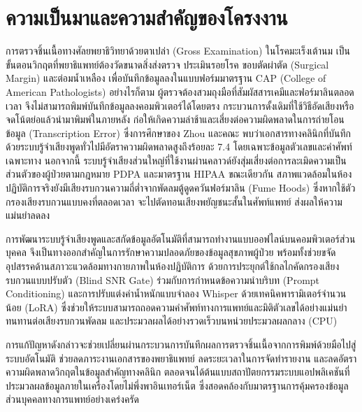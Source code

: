 \section{ความเป็นมาและความสำคัญของโครงงาน}
การตรวจชิ้นเนื้อทางศัลยพยาธิวิทยาด้วยตาเปล่า (Gross Examination) ในโรคมะเร็งเต้านม เป็นขั้นตอนวิกฤตที่พยาธิแพทย์ต้องวัดขนาดสิ่งส่งตรวจ ประเมินรอยโรค ขอบตัดผ่าตัด (Surgical Margin) และต่อมน้ำเหลือง เพื่อบันทึกข้อมูลลงในแบบฟอร์มมาตรฐาน CAP (College of American Pathologists) \cite{cap_breast, ajcc2017} อย่างไรก็ตาม ผู้ตรวจต้องสวมถุงมือที่สัมผัสสารเคมีและฟอร์มาลินตลอดเวลา จึงไม่สามารถพิมพ์บันทึกข้อมูลลงคอมพิวเตอร์ได้โดยตรง กระบวนการดั้งเดิมที่ใช้วิธีอัดเสียงหรือจดโน้ตย่อแล้วนำมาพิมพ์ในภายหลัง ก่อให้เกิดความล่าช้าและเสี่ยงต่อความผิดพลาดในการถ่ายโอนข้อมูล (Transcription Error) \cite{zhou2018errors} ซึ่งการศึกษาของ Zhou และคณะ พบว่าเอกสารทางคลินิกที่บันทึกด้วยระบบรู้จำเสียงพูดทั่วไปมีอัตราความผิดพลาดสูงถึงร้อยละ 7.4 โดยเฉพาะข้อมูลตัวเลขและคำศัพท์เฉพาะทาง \cite{zhou2018errors} นอกจากนี้ ระบบรู้จำเสียงส่วนใหญ่ที่ใช้งานผ่านคลาวด์ยังสุ่มเสี่ยงต่อการละเมิดความเป็นส่วนตัวของผู้ป่วยตามกฎหมาย PDPA และมาตรฐาน HIPAA ขณะเดียวกัน สภาพแวดล้อมในห้องปฏิบัติการจริงยังมีเสียงรบกวนความถี่ต่ำจากพัดลมตู้ดูดควันฟอร์มาลิน (Fume Hoods) \cite{radford2023whisper} ซึ่งหากใช้ตัวกรองเสียงรบกวนแบบคงที่ตลอดเวลา จะไปตัดทอนเสียงพยัญชนะสั้นในศัพท์แพทย์ ส่งผลให้ความแม่นยำลดลง

 
การพัฒนาระบบรู้จำเสียงพูดและสกัดข้อมูลอัตโนมัติที่สามารถทำงานแบบออฟไลน์บนคอมพิวเตอร์ส่วนบุคคล จึงเป็นทางออกสำคัญในการรักษาความปลอดภัยของข้อมูลสุขภาพผู้ป่วย พร้อมทั้งช่วยขจัดอุปสรรคด้านสภาวะแวดล้อมทางกายภาพในห้องปฏิบัติการ ด้วยการประยุกต์ใช้กลไกคัดกรองเสียงรบกวนแบบปรับตัว (Blind SNR Gate) ร่วมกับการกำหนดข้อความนำบริบท (Prompt Conditioning) และการปรับแต่งค่าน้ำหนักแบบจำลอง Whisper ด้วยเทคนิคพารามิเตอร์จำนวนน้อย (LoRA) ซึ่งช่วยให้ระบบสามารถถอดความคำศัพท์ทางการแพทย์และมิติตัวเลขได้อย่างแม่นยำ ทนทานต่อเสียงรบกวนพัดลม และประมวลผลได้อย่างรวดเร็วบนหน่วยประมวลผลกลาง (CPU)

   
การแก้ปัญหาดังกล่าวจะช่วยเปลี่ยนผ่านกระบวนการบันทึกผลการตรวจชิ้นเนื้อจากการพิมพ์ด้วยมือไปสู่ระบบอัตโนมัติ ช่วยลดภาระงานเอกสารของพยาธิแพทย์ ลดระยะเวลาในการจัดทำรายงาน และลดอัตราความผิดพลาดวิกฤตในข้อมูลสำคัญทางคลินิก ตลอดจนได้ต้นแบบสถาปัตยกรรมระบบแอปพลิเคชันที่ประมวลผลข้อมูลภายในเครื่องโดยไม่พึ่งพาอินเทอร์เน็ต ซึ่งสอดคล้องกับมาตรฐานการคุ้มครองข้อมูลส่วนบุคคลทางการแพทย์อย่างเคร่งครัด
    


